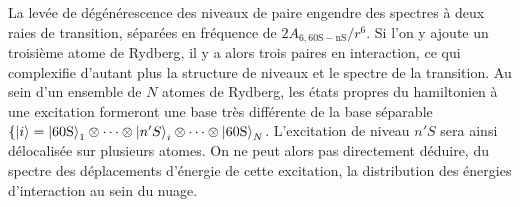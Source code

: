 %
La levée de dégénérescence des niveaux de paire engendre des spectres à deux raies de transition, séparées en fréquence de $2A_{6,\mathrm{60S-nS}}/r^6$.
Si l'on y ajoute un troisième atome de Rydberg, il y a alors trois paires en interaction, ce qui complexifie d'autant plus la structure de niveaux et le spectre de la transition.
Au sein d'un ensemble de $N$ atomes de Rydberg, les états propres du hamiltonien à une excitation formeront une base très différente de la base séparable $\{\ket{i} = 
\ket{\mathrm{60S}}_1\otimes\dots\otimes\ket{n'S}_i\otimes\dots\otimes\ket{\mathrm{60S}}_N$.
L'excitation de niveau $n'S$ sera ainsi délocalisée sur plusieurs atomes.
On ne peut alors pas directement déduire, du spectre des déplacements d'énergie de cette excitation, la distribution des énergies d'interaction au sein du nuage.


